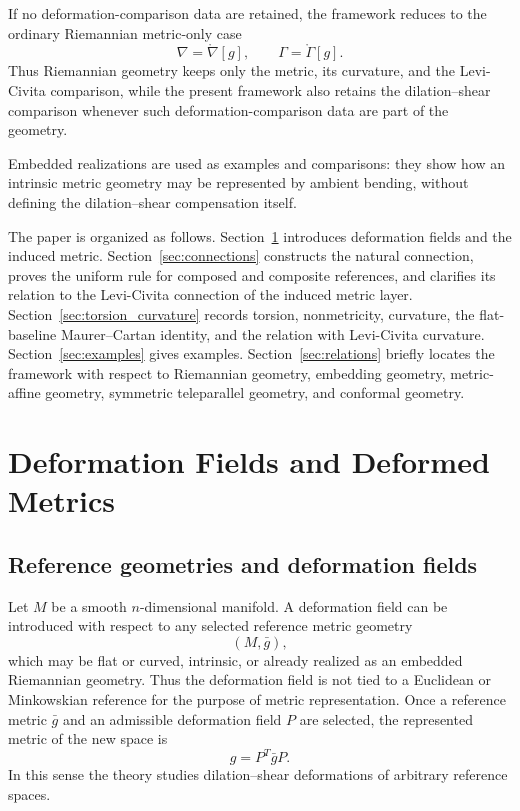 \documentclass[12pt]{amsart}
\theoremstyle{definition}
\theoremstyle{remark}
\begin{document}
If no deformation-comparison data are retained, the framework reduces to the ordinary Riemannian metric-only case
\begin{equation}\label{eq:intro_riemannian_limit}
 \nabla=\mathring\nabla[g], \qquad \Gamma=\mathring\Gamma[g].
\end{equation}
Thus Riemannian geometry keeps only the metric, its curvature, and the Levi-Civita comparison, while the present framework also retains the dilation--shear comparison whenever such deformation-comparison data are part of the geometry.

Embedded realizations are used as examples and comparisons: they show how an intrinsic metric geometry may be represented by ambient bending, without defining the dilation--shear compensation itself.

The paper is organized as follows.  Section~\ref{sec:metric} introduces deformation fields and the induced metric.  Section~\ref{sec:connections} constructs the natural connection, proves the uniform rule for composed and composite references, and clarifies its relation to the Levi-Civita connection of the induced metric layer.  Section~\ref{sec:torsion_curvature} records torsion, nonmetricity, curvature, the flat-baseline Maurer--Cartan identity, and the relation with Levi-Civita curvature.  Section~\ref{sec:examples} gives examples.  Section~\ref{sec:relations} briefly locates the framework with respect to Riemannian geometry, embedding geometry, metric-affine geometry, symmetric teleparallel geometry, and conformal geometry.

\section{Deformation Fields and Deformed Metrics}\label{sec:metric}

\subsection{Reference geometries and deformation fields}

Let $M$ be a smooth $n$-dimensional manifold.  A deformation field can be introduced with respect to any selected reference metric geometry
\begin{equation}
 (M,\bar g),
\end{equation}
which may be flat or curved, intrinsic, or already realized as an embedded Riemannian geometry.  Thus the deformation field is not tied to a Euclidean or Minkowskian reference for the purpose of metric representation.  Once a reference metric \(\bar g\) and an admissible deformation field \(P\) are selected, the represented metric of the new space is
\begin{equation}
 g=P^T\bar gP .
\end{equation}
In this sense the theory studies dilation--shear deformations of arbitrary reference spaces.
\end{document}
